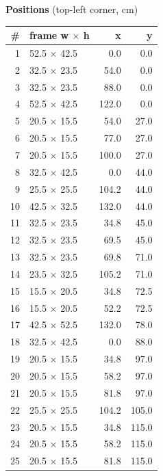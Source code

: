 \documentclass[a4paper,landscape,10pt]{article}
\begin{document}
\begin{minipage}[t]{0.25\textwidth}
\vspace{8pt}
{\bfseries Positions} (top-left corner, cm)\\[2pt]
\tiny
\begin{tabular}{@{}r l r r@{}}
\toprule
\# & frame w $\times$ h & x & y \\
\midrule
1 & 52.5 $\times$ 42.5 & 0.0 & 0.0 \\
2 & 32.5 $\times$ 23.5 & 54.0 & 0.0 \\
3 & 32.5 $\times$ 23.5 & 88.0 & 0.0 \\
4 & 52.5 $\times$ 42.5 & 122.0 & 0.0 \\
5 & 20.5 $\times$ 15.5 & 54.0 & 27.0 \\
6 & 20.5 $\times$ 15.5 & 77.0 & 27.0 \\
7 & 20.5 $\times$ 15.5 & 100.0 & 27.0 \\
8 & 32.5 $\times$ 42.5 & 0.0 & 44.0 \\
9 & 25.5 $\times$ 25.5 & 104.2 & 44.0 \\
10 & 42.5 $\times$ 32.5 & 132.0 & 44.0 \\
11 & 32.5 $\times$ 23.5 & 34.8 & 45.0 \\
12 & 32.5 $\times$ 23.5 & 69.5 & 45.0 \\
13 & 32.5 $\times$ 23.5 & 69.8 & 71.0 \\
14 & 23.5 $\times$ 32.5 & 105.2 & 71.0 \\
15 & 15.5 $\times$ 20.5 & 34.8 & 72.5 \\
16 & 15.5 $\times$ 20.5 & 52.2 & 72.5 \\
17 & 42.5 $\times$ 52.5 & 132.0 & 78.0 \\
18 & 32.5 $\times$ 42.5 & 0.0 & 88.0 \\
19 & 20.5 $\times$ 15.5 & 34.8 & 97.0 \\
20 & 20.5 $\times$ 15.5 & 58.2 & 97.0 \\
21 & 20.5 $\times$ 15.5 & 81.8 & 97.0 \\
22 & 25.5 $\times$ 25.5 & 104.2 & 105.0 \\
23 & 20.5 $\times$ 15.5 & 34.8 & 115.0 \\
24 & 20.5 $\times$ 15.5 & 58.2 & 115.0 \\
25 & 20.5 $\times$ 15.5 & 81.8 & 115.0 \\
\bottomrule
\end{tabular}
\end{minipage}
\clearpage
\end{document}
